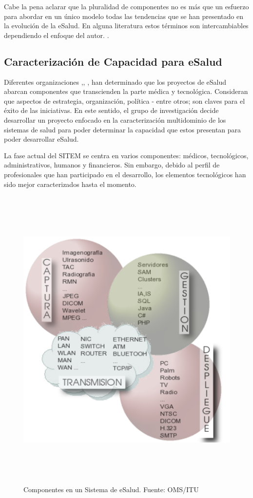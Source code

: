 Cabe la pena aclarar que la pluralidad de componentes no es más que un esfuerzo para abordar en un único modelo todas las tendencias que se han presentado en la evolución de la eSalud. En alguna literatura estos términos son intercambiables dependiendo el enfoque del autor. \cite{oms2010}.

\subsection{Caracterización de Capacidad para eSalud}

Diferentes organizaciones \cite{ops2011},\cite{oms2016}, \cite{ituoms2012}, han determinado que los proyectos de eSalud abarcan componentes que transcienden la parte médica y tecnológica. Consideran que aspectos de estrategia, organización, política - entre otros; son claves para el éxito de las iniciativas. En este sentido, el grupo de investigación decide desarrollar un proyecto enfocado en la caracterización multidominio de los sistemas de salud para poder determinar la capacidad que estos presentan para poder desarrollar eSalud. 

La fase actual del SITEM se centra en varios componentes: médicos, tecnológicos, administrativos, humanos y financieros. Sin embargo, debido al perfil de profesionales que han participado en el desarrollo, los elementos tecnológicos han sido mejor caracterizados hasta el momento.

\begin{figure}
 \centering
 \includegraphics[width=156mm, height=156mm]{red_1.png}
 \caption{Componentes en un Sistema de eSalud. Fuente: OMS/ITU}
 \label{subcomponentes}
\end{figure}

